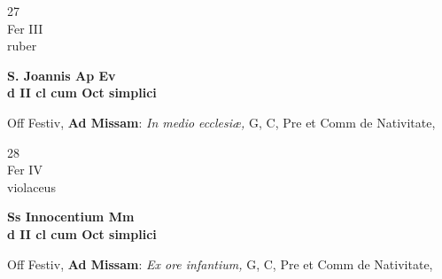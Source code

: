 \documentclass[10pt, openany]{book}
\begin{document}
        \begin{center}
            \begin{minipage}{3.5in}
                \vspace{2em}
                \begin{minipage}{0.5in}
                    {\Huge 27} \\
                    {\normalsize Fer III} \\
                    {\normalsize ruber}
                \end{minipage}
                \begin{minipage}{3.0in}
                    \textbf{ \large S. Joannis Ap Ev \\
                    \textnormal{\normalsize d II cl cum Oct simplici}} \\ 
                \end{minipage}
                \begin{justify}Off Festiv, \textbf{Ad Missam}: \textit{In medio ecclesiæ,} G, C, Pre et Comm de Nativitate,   
                \end{justify}
            \end{minipage}
        \end{center}
    
        \begin{center}
            \begin{minipage}{3.5in}
                \vspace{2em}
                \begin{minipage}{0.5in}
                    {\Huge 28} \\
                    {\normalsize Fer IV} \\
                    {\normalsize violaceus}
                \end{minipage}
                \begin{minipage}{3.0in}
                    \textbf{ \large Ss Innocentium Mm \\
                    \textnormal{\normalsize d II cl cum Oct simplici}} \\ 
                \end{minipage}
                \begin{justify}Off Festiv, \textbf{Ad Missam}: \textit{Ex ore infantium,} G, C, Pre et Comm de Nativitate,   
                \end{justify}
            \end{minipage}
        \end{center}
    
\end{document}
